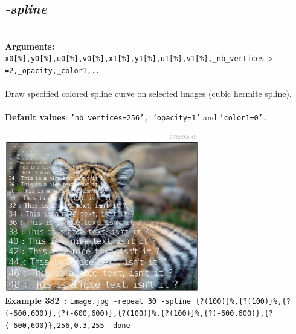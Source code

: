 \documentclass[a4paper,11pt,twoside]{book}
\begin{document}
\subsection{\emph{-spline} }\vspace*{-0.5em}
~\\\textbf{Arguments: } 
{\small \texttt{x0[\%],y0[\%],u0[\%],v0[\%],x1[\%],y1[\%],u1[\%],v1[\%],\_nb\_vertices$>$=2,\_opacity,\_color1,..}}\\~\\
Draw specified colored spline curve on selected images (cubic hermite spline).
~\\~\\\textbf{Default values}: {\small \texttt{'nb\_vertices=256', 'opacity=1'} and \texttt{'color1=0'.}}
\begin{center}\includegraphics[keepaspectratio=true,height=7cm,width=\textwidth]{img/gmic_def382.jpg}\\
{\footnotesize \textbf{Example 382~:} \texttt{image.jpg -repeat 30 -spline \{?(100)\}\%,\{?(100)\}\%,\{?(-600,600)\},\{?(-600,600)\},\{?(100)\}\%,\{?(100)\}\%,\{?(-600,600)\},\{?(-600,600)\},256,0.3,255 -done}}
\end{center}
\end{document}
